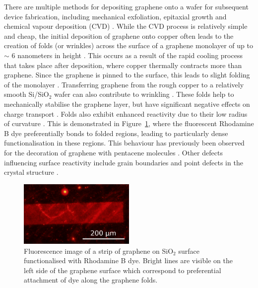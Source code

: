 \documentclass[
  a4paper,
]{scrbook}
\begin{document}
There are multiple methods for depositing graphene onto a wafer for
subsequent device fabrication, including mechanical exfoliation,
epitaxial growth and chemical vapour deposition (CVD)
\autocite{Reddy2011}. While the CVD process is relatively simple and
cheap, the initial deposition of graphene onto copper often leads to the
creation of folds (or wrinkles) across the surface of a graphene
monolayer of up to \(\sim\) 6 nanometers in height \autocite{Zhu2012}.
This occurs as a result of the rapid cooling process that takes place
after deposition, where copper thermally contracts more than graphene.
Since the graphene is pinned to the surface, this leads to slight
folding of the monolayer \autocite{Zhao2012,Zhu2012,Chhikara2013}.
Transferring graphene from the rough copper to a relatively smooth
Si/SiO\(_2\) wafer can also contribute to wrinkling
\autocite{Zhao2012,Kireev2017}. These folds help to mechanically
stabilise the graphene layer, but have significant negative effects on
charge transport \autocite{Geim2007,Chhikara2013,Zhu2012}. Folds also
exhibit enhanced reactivity due to their low radius of curvature
\autocite{Zhao2012}. This is demonstrated in
Figure~\ref{fig-graphene-folds}, where the fluorescent Rhodamine B dye
preferentially bonds to folded regions, leading to particularly dense
functionalisation in these regions. This behaviour has previously been
observed for the decoration of graphene with pentacene molecules
\autocite{Chhikara2013}. Other defects influencing surface reactivity
include grain boundaries and point defects in the crystal structure
\autocite{Zhao2012,Chhikara2013,Kireev2017}.

\begin{figure}

{\centering \includegraphics[width=0.5\textwidth,height=\textheight]{figures/ch2/modified_NGW8D4_1mM_rhodamineB_centralchannel3_postMsurfactantclean5min_2.4sexposure_20X_221111.png}

}

\caption[Fluorescence image of a strip of graphene functionalised with
Rhodamine B dye with graphene folds
visible.]{\label{fig-graphene-folds}Fluorescence image of a strip of
graphene on SiO\(_2\) surface functionalised with Rhodamine B dye.
Bright lines are visible on the left side of the graphene surface which
correspond to preferential attachment of dye along the graphene folds.}

\end{figure}
\end{document}
